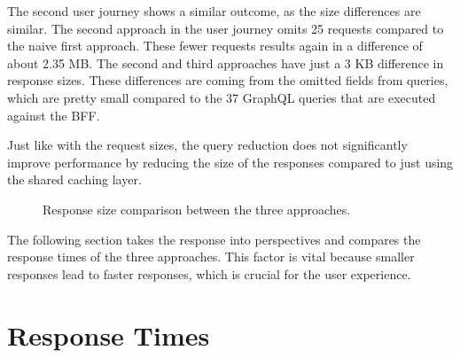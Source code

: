 \bigskip

\noindent The second user journey shows a similar outcome, as the size differences are similar. The second approach in the user journey omits 25 requests compared to the naive first approach. These fewer requests results again in a difference of about 2.35 MB. The second and third approaches have just a 3 KB difference in response sizes. These differences are coming from the omitted fields from queries, which are pretty small compared to the 37 GraphQL queries that are executed against the \ac{BFF}.

\bigskip

\noindent Just like with the request sizes, the query reduction does not significantly improve performance by reducing the size of the responses compared to just using the shared caching layer.

\begin{figure}[H]
  \centering
  \caption{Response size comparison between the three approaches.}\label{fig:discussion:response-size}
\end{figure}

\noindent The following section takes the response into perspectives and compares the response times of the three approaches. This factor is vital because smaller responses lead to faster responses, which is crucial for the user experience.

\section{Response Times}\label{section:discussion:response-times}

